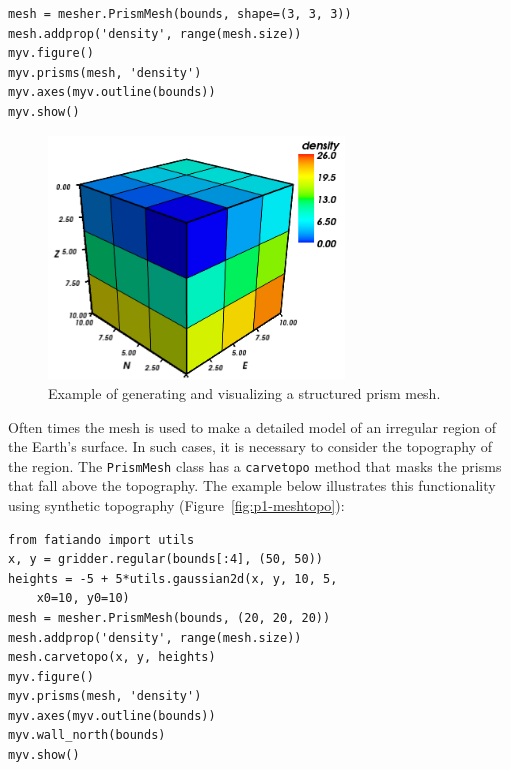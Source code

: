 \begin{verbatim}
mesh = mesher.PrismMesh(bounds, shape=(3, 3, 3))
mesh.addprop('density', range(mesh.size))
myv.figure()
myv.prisms(mesh, 'density')
myv.axes(myv.outline(bounds))
myv.show()
\end{verbatim}

\begin{figure}
    \centering
    \includegraphics[width=0.7\textwidth]{figures/paper-fatiando/meshes_3dplotting_mesh}
    \caption{
        Example of generating and visualizing a structured prism mesh.
    }
    \label{fig:p1-mesh}
\end{figure}

Often times the mesh is used to make a detailed model of an irregular
region of the Earth's surface. In such cases, it is necessary to
consider the topography of the region. The \texttt{PrismMesh} class has
a \texttt{carvetopo} method that masks the prisms that fall above the
topography. The example below illustrates this functionality using
synthetic topography (Figure~\ref{fig:p1-meshtopo}):

\begin{verbatim}
from fatiando import utils
x, y = gridder.regular(bounds[:4], (50, 50))
heights = -5 + 5*utils.gaussian2d(x, y, 10, 5,
    x0=10, y0=10)
mesh = mesher.PrismMesh(bounds, (20, 20, 20))
mesh.addprop('density', range(mesh.size))
mesh.carvetopo(x, y, heights)
myv.figure()
myv.prisms(mesh, 'density')
myv.axes(myv.outline(bounds))
myv.wall_north(bounds)
myv.show()
\end{verbatim}


